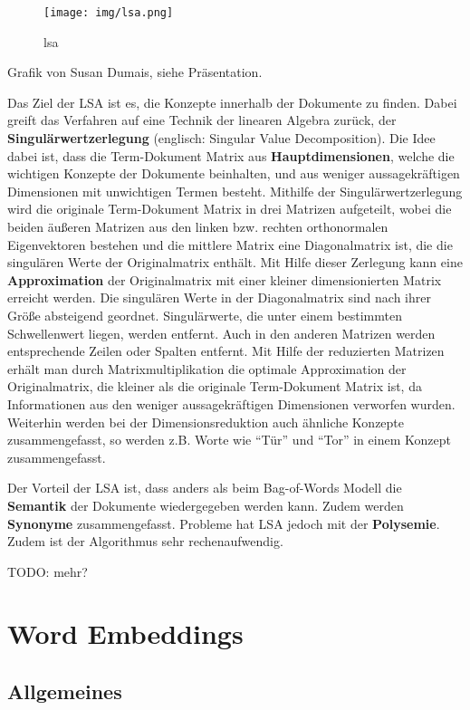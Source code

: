 \documentclass[11pt]{article}
\begin{document}
\begin{figure}
\centering
\texttt{[image: img/lsa.png]}
\caption{lsa}
\end{figure}

Grafik von Susan Dumais, siehe Präsentation.

    Das Ziel der LSA ist es, die Konzepte innerhalb der Dokumente zu finden.
Dabei greift das Verfahren auf eine Technik der linearen Algebra zurück,
der \textbf{Singulärwertzerlegung} (englisch: Singular Value
Decomposition). Die Idee dabei ist, dass die Term-Dokument Matrix aus
\textbf{Hauptdimensionen}, welche die wichtigen Konzepte der Dokumente
beinhalten, und aus weniger aussagekräftigen Dimensionen mit unwichtigen
Termen besteht. Mithilfe der Singulärwertzerlegung wird die originale
Term-Dokument Matrix in drei Matrizen aufgeteilt, wobei die beiden
äußeren Matrizen aus den linken bzw. rechten orthonormalen Eigenvektoren
bestehen und die mittlere Matrix eine Diagonalmatrix ist, die die
singulären Werte der Originalmatrix enthält. Mit Hilfe dieser Zerlegung
kann eine \textbf{Approximation} der Originalmatrix mit einer kleiner
dimensionierten Matrix erreicht werden. Die singulären Werte in der
Diagonalmatrix sind nach ihrer Größe absteigend geordnet. Singulärwerte,
die unter einem bestimmten Schwellenwert liegen, werden entfernt. Auch
in den anderen Matrizen werden entsprechende Zeilen oder Spalten
entfernt. Mit Hilfe der reduzierten Matrizen erhält man durch
Matrixmultiplikation die optimale Approximation der Originalmatrix, die
kleiner als die originale Term-Dokument Matrix ist, da Informationen aus
den weniger aussagekräftigen Dimensionen verworfen wurden. Weiterhin
werden bei der Dimensionsreduktion auch ähnliche Konzepte
zusammengefasst, so werden z.B. Worte wie ``Tür'' und ``Tor'' in einem
Konzept zusammengefasst.

Der Vorteil der LSA ist, dass anders als beim Bag-of-Words Modell die
\textbf{Semantik} der Dokumente wiedergegeben werden kann. Zudem werden
\textbf{Synonyme} zusammengefasst. Probleme hat LSA jedoch mit der
\textbf{Polysemie}. Zudem ist der Algorithmus sehr rechenaufwendig.

TODO: mehr?

    \hypertarget{word-embeddings}{%
\section{Word Embeddings}\label{word-embeddings}}

\hypertarget{allgemeines}{%
\subsection{Allgemeines}\label{allgemeines}}
\end{document}
